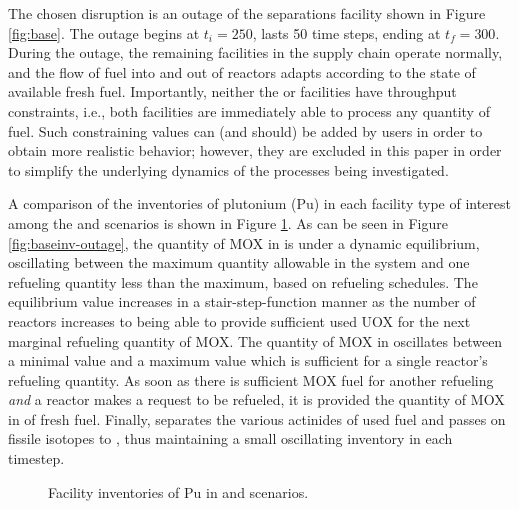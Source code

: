 The chosen disruption is an outage of the separations facility shown in Figure
\ref{fig:base}. The outage begins at $t_i = 250$, lasts 50 time steps, ending at
$t_f = 300$. During the outage, the remaining facilities in the supply chain
operate normally, and the flow of fuel into and out of reactors adapts according
to the state of available fresh fuel. Importantly, neither the \separations or
\fabrication facilities have throughput constraints, i.e., both facilities are
immediately able to process any quantity of fuel. Such constraining values can (and should) be added by users in order to obtain more realistic behavior; however, they are excluded in this paper in order to simplify the underlying dynamics of the processes being investigated. 

A comparison of the inventories of plutonium (Pu) in each facility type of
interest among the \basecase and \outage scenarios is shown in Figure
\ref{fig:outage}. As can be seen in Figure \ref{fig:baseinv-outage}, the
quantity of MOX in \reactors is under a dynamic equilibrium, oscillating between
the maximum quantity allowable in the system and one refueling quantity less
than the maximum, based on refueling schedules. The equilibrium value increases
in a stair-step-function manner as the number of reactors increases to being
able to provide sufficient used UOX for the next marginal refueling quantity of
MOX. The quantity of MOX in \fabrication oscillates between a minimal value and
a maximum value which is sufficient for a single reactor's refueling
quantity. As soon as there is sufficient MOX fuel for another refueling
\textit{and} a reactor makes a request to be refueled, it is provided the
quantity of MOX in of fresh fuel. Finally, \separations separates the various
actinides of used fuel and passes on fissile isotopes to \fabrication, thus
maintaining a small oscillating inventory in each timestep.

\begin{figure}
  \centering
  \begin{minipage}{0.67\textwidth}
    \centering 
    \vfill 
  \end{minipage}%
  \begin{minipage}{0.33\textwidth}
    \centering
  \end{minipage}%
  \caption[]{
    \label{fig:outage}
    Facility inventories of Pu in \basecase and \outage scenarios.}
\end{figure}

